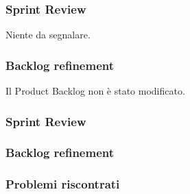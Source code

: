\subsubsection{Sprint Review}
Niente da segnalare.

\subsubsection{Backlog refinement}
Il Product Backlog non è stato modificato.

\subsubsection{Sprint Review}
\subsubsection{Backlog refinement}
\subsubsection{Problemi riscontrati}

